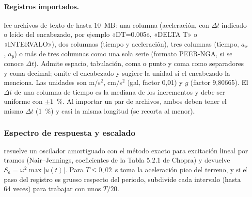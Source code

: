 \paragraph{Registros importados.}  lee archivos de texto de hasta 10~MB: una columna
(aceleración, con $\Delta t$ indicado o leído del encabezado, por ejemplo «DT=0.005», «DELTA T» o «INTERVALO»), dos
columnas (tiempo y aceleración), tres columnas (tiempo, $a_x$, $a_y$) o más de tres columnas como una sola serie (formato
PEER-NGA, si se conoce $\Delta t$). Admite espacio, tabulación, coma o punto y coma como separadores y coma decimal;
omite el encabezado y sugiere la unidad si el encabezado la menciona. Las unidades son m/s$^2$, cm/s$^2$ (gal, factor
0,01) y $g$ (factor 9,80665). El $\Delta t$ de una columna de tiempo es la mediana de los incrementos y debe ser uniforme
con $\pm 1$~\%. Al importar un par de archivos, ambos deben tener el mismo $\Delta t$ (1~\%) y casi la misma longitud (se
recorta al menor).

\subsubsection{Espectro de respuesta y escalado}

 resuelve un oscilador amortiguado con el método exacto para
excitación lineal por tramos (Nair--Jennings, coeficientes de la Tabla 5.2.1 de Chopra) y devuelve
$S_a = \omega^2 \max|u(t)|$. Para $T \le 0{,}02$~s toma la aceleración pico del terreno, y si el paso del registro es
grueso respecto del periodo, subdivide cada intervalo (hasta 64 veces) para trabajar con unos $T/20$.

